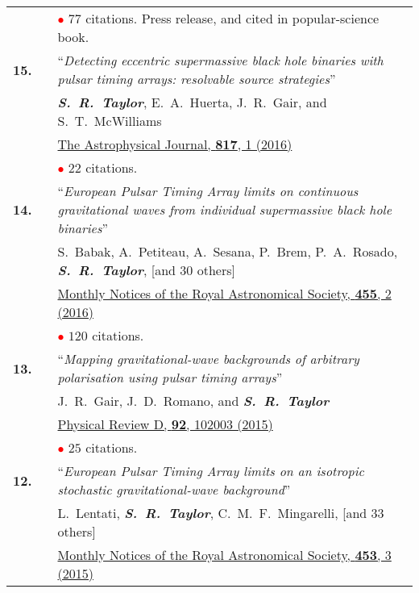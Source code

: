 \documentclass[11pt,letterpaper,sans]{moderncv}
\begin{document}
{\begin{longtable}{rp{0.3cm}p{15.8cm}}
&& \textcolor{red}{$\bullet$} $77$ citations. Press release, and cited in popular-science book. \vspace{0.09cm}\\
\textbf{15.} & & ``\textit{Detecting eccentric supermassive black hole binaries with pulsar timing arrays: resolvable source strategies}'' \\ 
&& \textit{\textbf{S.~R.~Taylor}}, E.~A.~Huerta, J.~R.~Gair, and S.~T.~McWilliams \\ 
&& \href{http://iopscience.iop.org/article/10.3847/0004-637X/817/1/70/meta}{{\color{color1} The Astrophysical Journal, \textbf{817}, 1 (2016)}} \\
&& \textcolor{red}{$\bullet$} $22$ citations. \vspace{0.09cm}\\
\textbf{14.} & & ``\textit{European Pulsar Timing Array limits on continuous gravitational waves from individual supermassive black hole binaries}'' \\ 
&& S.~Babak, A.~Petiteau, A.~Sesana, P.~Brem, P.~A.~Rosado, \textit{\textbf{S.~R.~Taylor}}, [and 30 others] \\ 
&& \href{http://mnras.oxfordjournals.org/content/455/2/1665}{{\color{color1} Monthly Notices of the Royal Astronomical Society, \textbf{455}, 2 (2016)}} \\
&& \textcolor{red}{$\bullet$} $120$ citations. \vspace{0.09cm}\\
\textbf{13.} & & ``\textit{Mapping gravitational-wave backgrounds of arbitrary polarisation using pulsar timing arrays}'' \\ 
&& J.~R.~Gair, J.~D.~Romano, and \textit{\textbf{S.~R.~Taylor}} \\ 
&& \href{http://journals.aps.org/prd/abstract/10.1103/PhysRevD.92.102003}{{\color{color1} Physical Review D, \textbf{92}, 102003 (2015)}} \\
&& \textcolor{red}{$\bullet$} $25$ citations. \vspace{0.09cm}\\
\textbf{12.} & & ``\textit{European Pulsar Timing Array limits on an isotropic stochastic gravitational-wave background}'' \\ 
&& L.~Lentati, \textit{\textbf{S.~R.~Taylor}}, C.~M.~F.~Mingarelli, [and 33 others] \\ 
&& \href{http://mnras.oxfordjournals.org/content/453/3/2576}{{\color{color1} Monthly Notices of the Royal Astronomical Society, \textbf{453}, 3 (2015)}} \\

\end{longtable}}
\end{document}
